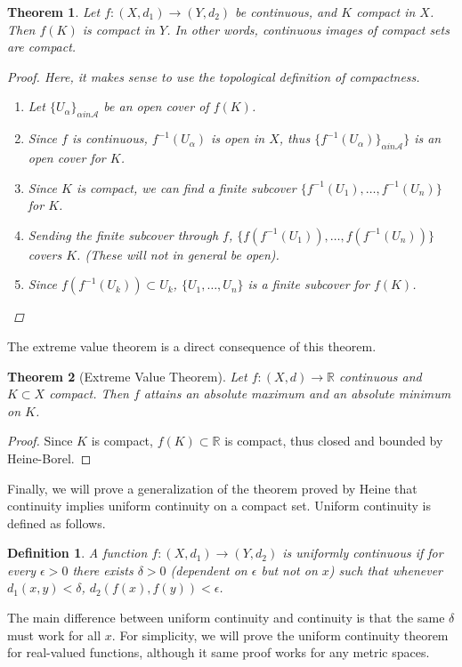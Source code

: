 \documentclass[10pt]{article}         %
\newtheorem{definition}{Definition}[section]
\newtheorem{theorem}{Theorem}[section]
\theoremstyle{remark}
\newcommand{\R}{\mathbb{R}}
\begin{document}
\begin{theorem}
Let $f: (X, d_1) \rightarrow (Y, d_2)$ be continuous, and $K$ compact in $X$. Then $f(K)$ is compact in $Y$. In other words, continuous images of compact sets are compact.
\begin{proof}
Here, it makes sense to use the topological definition of compactness.
\begin{enumerate}
    \item Let $\{ U_\alpha \}_{\alpha in \mathcal{A}}$ be an open cover of $f(K)$. \item Since $f$ is continuous, $f^{-1}(U_\alpha)$ is open in $X$, thus $\{ f^{-1}(U_\alpha) \}_{\alpha in \mathcal{A}} \}$ is an open cover for $K$. 
    \item Since $K$ is compact, we can find a finite subcover $\{ f^{-1}(U_1), \dots, f^{-1}(U_n) \}$ for $K$. 
    \item Sending the finite subcover through $f$, $\{ f(f^{-1}(U_1)), \dots, f(f^{-1}(U_n)) \}$ covers $K$. (These will not in general be open).
    \item Since $f(f^{-1}(U_k)) \subset U_k$, $\{ U_1, \dots, U_n \}$ is a finite subcover for $f(K)$.
\end{enumerate}
\end{proof}
\end{theorem}

The extreme value theorem is a direct consequence of this theorem.

\begin{theorem}[Extreme Value Theorem]
Let $f: (X, d) \rightarrow \R$ continuous and $K \subset X$ compact. Then $f$ attains an absolute maximum and an absolute minimum on $K$.  
\end{theorem}
\begin{proof}
Since $K$ is compact, $f(K) \subset \R$ is compact, thus closed and bounded by Heine-Borel.
\end{proof}

Finally, we will prove a generalization of the theorem proved by Heine that continuity implies uniform continuity on a compact set. Uniform continuity is defined as follows.

\begin{definition}
A function $f: (X, d_1) \rightarrow (Y, d_2)$ is \emph{uniformly continuous} if for every $\epsilon > 0$ there exists $\delta > 0$ (dependent on $\epsilon$ but not on $x$) such that whenever $d_1(x, y) < \delta$, $d_2(f(x), f(y)) < \epsilon$.
\end{definition}
The main difference between uniform continuity and continuity is that the same $\delta$ must work for all $x$. For simplicity, we will prove the uniform continuity theorem for real-valued functions, although it same proof works for any metric spaces.
\end{document}
